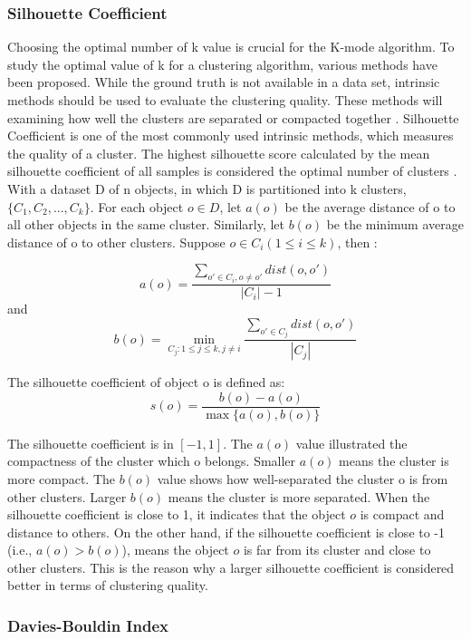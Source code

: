 \documentclass{article}
\begin{document}
\subsubsection{Silhouette Coefficient}

\noindent Choosing the optimal number of k value is crucial for the 
K-mode algorithm. To study the optimal value of k for a clustering algorithm, 
various methods have been proposed. While the ground truth is not available
in a data set, intrinsic methods should be used to evaluate the 
clustering quality. These methods will examining how well the clusters
are separated or compacted together \citep{2012vi}. Silhouette Coefficient is one of the most
commonly used intrinsic methods, which measures the quality of a cluster. The highest
silhouette score calculated by the mean silhouette coefficient of all samples
is considered the optimal number of clusters \citep{9260048}. \\

\noindent With a dataset D of n objects, in which D is partitioned into 
k clusters, $\{C_1,C_2,...,C_k\}$. For each object $o \in D$, 
let $a(o)$ be the average distance of o to all other objects in the same cluster.
Similarly, let $b(o)$ be the minimum average distance of o to other clusters.
Suppose $o \in C_i(1 \leq i \leq k )$, then \citep{2012vi}: 

$$a(o) = \frac{\sum_{o' \in C_i , o \neq o'} dist(o,o')}{|C_i| - 1}$$
and
$$b(o) = \min_{C_j: 1 \leq j \leq k, j \neq i} \frac{\sum_{o' \in C_j} dist(o,o')}{|C_j|}$$

The silhouette coefficient of object o is defined as:
$$s(o) = \frac{b(o) - a(o)}{\max\{a(o),b(o)\}}$$

\pagebreak

\noindent The silhouette coefficient is in $[-1,1]$. The $a(o)$ value illustrated
the compactness of the cluster which o belongs. Smaller $a(o)$ means the
cluster is more compact. The $b(o)$ value shows how well-separated the 
cluster o is from other clusters. Larger $b(o)$ means the cluster is
more separated. When the silhouette coefficient is close to 1, it indicates
that the object $o$ is compact and distance to others. On the other hand, 
if the silhouette coefficient is close to -1 (i.e., $a(o) > b(o)$), means
the object $o$ is far from its cluster and close to other clusters. This is
the reason why a larger silhouette coefficient is considered better in terms of
clustering quality. 


\subsubsection{Davies-Bouldin Index}
\end{document}
